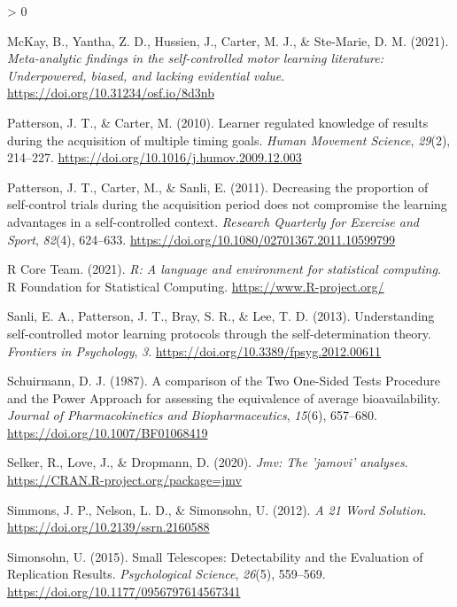 \documentclass[
  english,
  man,floatsintext]{apa7}
\newlength{\cslhangindent}
\newenvironment{CSLReferences}[2] %
 {%
  \setlength{\parindent}{0pt}
  \ifodd #1 \everypar{\setlength{\hangindent}{\cslhangindent}}\ignorespaces\fi
  \ifnum #2 > 0
  \setlength{\parskip}{#2\baselineskip}
  \fi
 }%
 {}
\begin{document}
\begin{CSLReferences}{1}{0}
\leavevmode\hypertarget{ref-mckay2021}{}%
McKay, B., Yantha, Z. D., Hussien, J., Carter, M. J., \& Ste-Marie, D. M. (2021). \emph{Meta-analytic findings in the self-controlled motor learning literature: Underpowered, biased, and lacking evidential value}. \url{https://doi.org/10.31234/osf.io/8d3nb}

\leavevmode\hypertarget{ref-patterson2010}{}%
Patterson, J. T., \& Carter, M. (2010). Learner regulated knowledge of results during the acquisition of multiple timing goals. \emph{Human Movement Science}, \emph{29}(2), 214--227. \url{https://doi.org/10.1016/j.humov.2009.12.003}

\leavevmode\hypertarget{ref-patterson2011}{}%
Patterson, J. T., Carter, M., \& Sanli, E. (2011). Decreasing the proportion of self-control trials during the acquisition period does not compromise the learning advantages in a self-controlled context. \emph{Research Quarterly for Exercise and Sport}, \emph{82}(4), 624--633. \url{https://doi.org/10.1080/02701367.2011.10599799}

\leavevmode\hypertarget{ref-R-base}{}%
R Core Team. (2021). \emph{R: A language and environment for statistical computing}. R Foundation for Statistical Computing. \url{https://www.R-project.org/}

\leavevmode\hypertarget{ref-sanli2013}{}%
Sanli, E. A., Patterson, J. T., Bray, S. R., \& Lee, T. D. (2013). Understanding self-controlled motor learning protocols through the self-determination theory. \emph{Frontiers in Psychology}, \emph{3}. \url{https://doi.org/10.3389/fpsyg.2012.00611}

\leavevmode\hypertarget{ref-schuirmann1987}{}%
Schuirmann, D. J. (1987). A comparison of the Two One-Sided Tests Procedure and the Power Approach for assessing the equivalence of average bioavailability. \emph{Journal of Pharmacokinetics and Biopharmaceutics}, \emph{15}(6), 657--680. \url{https://doi.org/10.1007/BF01068419}

\leavevmode\hypertarget{ref-R-jmv}{}%
Selker, R., Love, J., \& Dropmann, D. (2020). \emph{Jmv: The 'jamovi' analyses}. \url{https://CRAN.R-project.org/package=jmv}

\leavevmode\hypertarget{ref-simmons2012}{}%
Simmons, J. P., Nelson, L. D., \& Simonsohn, U. (2012). \emph{A 21 Word Solution}. \url{https://doi.org/10.2139/ssrn.2160588}

\leavevmode\hypertarget{ref-simonsohn2015}{}%
Simonsohn, U. (2015). Small Telescopes: Detectability and the Evaluation of Replication Results. \emph{Psychological Science}, \emph{26}(5), 559--569. \url{https://doi.org/10.1177/0956797614567341}


\end{CSLReferences}
\end{document}
